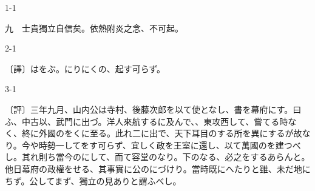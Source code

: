 \documentclass[tate,paper=b6j,jafontsize=9pt]{jlreq}
\begin{document}
\begin{azconvIndented}{1\zw}{-1\zw}

九　士貴獨立自信矣。依熱附炎之念、不可起。

\end{azconvIndented}
\begin{azconvIndented}{2\zw}{-1\zw}

〔譯〕はをぶ。にりにくの、起す可らず。

\end{azconvIndented}
\begin{azconvIndented}{3\zw}{-1\zw}

〔評〕三年九月、山内公は寺村、後藤次郎を以て使となし、書を幕府にす。曰ふ、中古以、武門に出づ。洋人來航するに及んで、、東攻西して、嘗てる時なく、終に外國のをくに至る。此れ二に出で、天下耳目のする所を異にするが故なり。今や時勢一してをす可らず、宜しく政を王室に還し、以て萬國のを建つべし。其れ則ち當今のにして、而て容堂のなり。下のなる、必之をするあらんと。他日幕府の政權をせる、其事實に公のにづけり。當時既にへたりと雖、未だ地にちず。公してまず、獨立の見ありと謂ふべし。

\end{azconvIndented}
\end{document}
